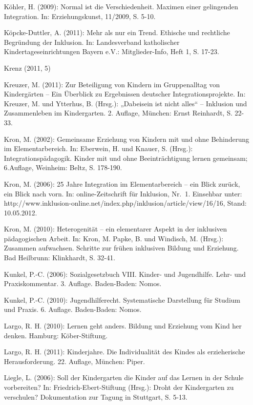 Köhler, H. (2009): Normal ist die Verschiedenheit. Maximen einer gelingenden Integration. In: Erziehungskunst, 11/2009, S. 5-10.

Köpcke-Duttler, A. (2011): Mehr als nur ein Trend. Ethische und rechtliche Begründung der Inklusion. In: Landesverband katholischer Kindertageseinrichtungen Bayern e.V.: Mitglieder-Info, Heft 1, S. 17-23.

Krenz (2011, 5)

Kreuzer, M. (2011): Zur Beteiligung von Kindern im Gruppenalltag von Kindergärten – Ein Überblick zu Ergebnissen deutscher Integrationsprojekte. In: Kreuzer, M. und Ytterhus, B. (Hrsg.): „Dabeisein ist nicht alles“ – Inklusion und Zusammenleben im Kindergarten. 2. Auflage, München: Ernst Reinhardt, S. 22-33.

Kron, M. (2002): Gemeinsame Erziehung von Kindern mit und ohne Behinderung im Elementarbereich. In: Eberwein, H. und Knauer, S. (Hrsg.): Integrationspädagogik. Kinder mit und ohne Beeinträchtigung lernen gemeinsam; 6.Auflage, Weinheim: Beltz, S. 178-190. 

Kron, M. (2006): 25 Jahre Integration im Elementarbereich – ein Blick zurück, ein Blick nach vorn. In: online-Zeitschrift für Inklusion, Nr.~1. Einsehbar unter: http://www.inklusion-online.net/index.php/inklusion/article/view/16/16, Stand: 10.05.2012.

Kron, M. (2010): Heterogenität – ein elementarer Aspekt in der inklusiven pädagogischen Arbeit. In: Kron, M. Papke, B. und Windisch, M. (Hrsg.): Zusammen aufwachsen. Schritte zur frühen inklusiven Bildung und Erziehung. Bad Heilbrunn: Klinkhardt, S. 32-41.

Kunkel, P.-C. (2006): Sozialgesetzbuch VIII. Kinder- und Jugendhilfe. Lehr- und Praxiskommentar. 3. Auflage. Baden-Baden: Nomos. 

Kunkel, P.-C. (2010): Jugendhilferecht. Systematische Darstellung für Studium und Praxis. 6. Auflage. Baden-Baden: Nomos. 

Largo, R. H. (2010): Lernen geht anders. Bildung und Erziehung vom Kind her denken. Hamburg: Köber-Stiftung. 

Largo, R. H. (2011): Kinderjahre. Die Individualität des Kindes als erzieherische Herausforderung. 22. Auflage, München: Piper.

Liegle, L. (2006): Soll der Kindergarten die Kinder auf das Lernen in der Schule vorbereiten? In: Friedrich-Ebert-Stiftung (Hrsg.): Droht der Kindergarten zu verschulen? Dokumentation zur Tagung in Stuttgart, S. 5-13.

